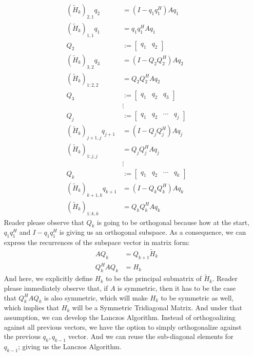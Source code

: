 \documentclass[]{article}
\theoremstyle{definition}
\begin{document}
            \begin{align}
                (\tilde{H}_k)_{2, 1}q_2 &= (I - q_1q_1^H)Aq_1
                \\
                (\tilde{H}_k)_{1, 1}q_1 &= q_1q_1^HAq_1
                \\
                Q_2 &:= \begin{bmatrix}
                    q_1 & q_2
                \end{bmatrix}
                \\
                (\tilde{H}_k)_{3, 2}q_3 &= (I - Q_2Q_2^H)Aq_2
                \\
                (\tilde{H}_k)_{1:2, 2} &= Q_2Q_2^HAq_2
                \\
                Q_3 &:= \begin{bmatrix}
                    q_1 & q_2 & q_3
                \end{bmatrix}
                \\
                & \vdots 
                \\
                Q_j &:= \begin{bmatrix}
                    q_1 & q_2 & \cdots & q_j
                \end{bmatrix}
                \\
                (\tilde{H}_k)_{j + 1, j}q_{j + 1}&= (I - Q_jQ_j^H)Aq_j
                \\
                (\tilde{H}_k)_{1:j, j} &= Q_jQ_j^HAq_j
                \\
                &\vdots 
                \\
                Q_k &:= \begin{bmatrix}
                    q_1 & q_2 & \cdots & q_k
                \end{bmatrix}
                \\
                (\tilde{H}_k)_{k + 1, k}q_{k + 1}&= (I - Q_kQ_k^H)Aq_k
                \\
                (\tilde{H}_k)_{1:k, k} &= Q_kQ_k^HAq_k
            \end{align}
            Reader please observe that $Q_k$ is going to be orthogonal because how at the start, $q_1q_1^H$ and $I - q_1q_1^H$ is giving us an orthogonal subspace. As a consequence, we can express the recurrences of the subspace vector in matrix form: 
            \begin{align}
                AQ_{k} &= Q_{k + 1}\tilde{H}_k
                \\
                Q_{k}^HAQ_{k} &= H_k
            \end{align}
            And here, we explicitly define $H_k$ to be the principal submatrix of $\tilde{H}_k$. Reader please immediately observe that, if $A$ is symmetric, then it has to be the case that $Q^H_kAQ_k$ is also symmetric, which will make $H_k$ to be symmetric as well, which implies that $H_k$ will be a Symmetric Tridiagonal Matrix. And under that assumption, we can develop the Lanczos Algorithm. Instead of orthogoalizing against all previous vectors, we have the option to simply orthogonalize against the previous $q_k, q_{k - 1}$ vector. And we can reuse the sub-diagonal elements for $q_{k - 1}$; giving us the Lanczos Algorithm. 
\end{document}
